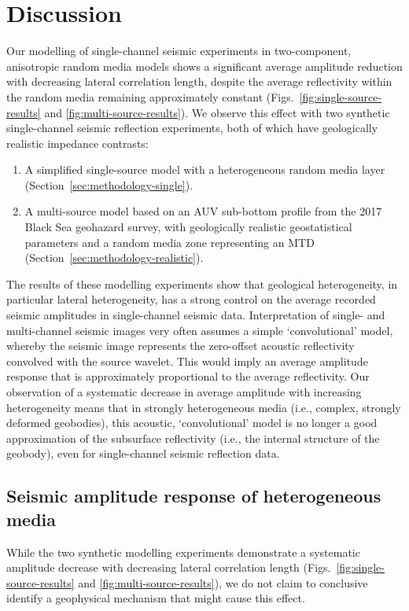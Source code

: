 \documentclass[se,manuscript]{copernicus}
\begin{document}
\section{Discussion}

Our modelling of single-channel seismic experiments in two-component, anisotropic random media models shows a significant average amplitude reduction with decreasing lateral correlation length, despite the average reflectivity within the random media remaining approximately constant (Figs.~\ref{fig:single-source-results} and \ref{fig:multi-source-results}).
We observe this effect with two synthetic single-channel seismic reflection experiments, both of which have geologically realistic impedance contrasts:
\begin{enumerate}
    \item A simplified single-source model with a heterogeneous random media layer (Section~\ref{sec:methodology-single}).
    \item A multi-source model based on an AUV sub-bottom profile from the 2017 Black Sea geohazard survey, with geologically realistic geostatistical parameters and a random media zone representing an MTD (Section~\ref{sec:methodology-realistic}).
\end{enumerate}
The results of these modelling experiments show that geological heterogeneity, in particular lateral heterogeneity, has a strong control on the average recorded seismic amplitudes in single-channel seismic data.
Interpretation of single- and multi-channel seismic images very often assumes a simple `convolutional’ model, whereby the seismic image represents the zero-offset acoustic reflectivity convolved with the source wavelet.
This would imply an average amplitude response that is approximately proportional to the average reflectivity.
Our observation of a systematic decrease in average amplitude with increasing heterogeneity means that in strongly heterogeneous media (i.e., complex, strongly deformed geobodies), this acoustic, ‘convolutional’ model is no longer a good approximation of the subsurface reflectivity (i.e., the internal structure of the geobody), even for single-channel seismic reflection data.

\subsection{Seismic amplitude response of heterogeneous media}
\label{sec:discussion-het-media}
While the two synthetic modelling experiments demonstrate a systematic amplitude decrease with decreasing lateral correlation length (Figs.~\ref{fig:single-source-results} and \ref{fig:multi-source-results}), we do not claim to conclusive identify a geophysical mechanism that might cause this effect.
\end{document}
